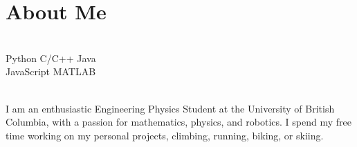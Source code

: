 \documentclass[]{deedy-resume-openfont}
\begin{document}
\vspace{10pt}

\section{About Me}
\begin{minipage}[t]{.35\textwidth}
	 \\
	Python \textbullet{} C/C++ \textbullet{} Java \\
	JavaScript \textbullet{} MATLAB
	\vspace{8pt}
\end{minipage}
\hfill
\begin{minipage}[t]{.55\textwidth}
	 \\
	I am an enthusiastic Engineering Physics Student at the University of British Columbia, with a passion for mathematics, physics, and robotics. I spend my free time working on my personal projects, climbing, running, biking, or skiing.
\end{minipage}
\end{document}
